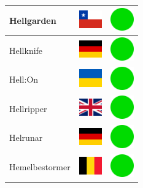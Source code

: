 \documentclass[12pt, a4paper, twoside]{report}
\begin{document}
\begin{center}
\begin{longtable}{|p{5cm}|p{2cm}|p{2cm}|}
 Hellgarden                                                 & \includegraphics[width=1cm]{4x3/cl} &   \includegraphics[width=1cm]{likes/y} \\ \hline
 Hellknife                                                  & \includegraphics[width=1cm]{4x3/de} &   \includegraphics[width=1cm]{likes/y} \\ \hline
 Hell:On                                                    & \includegraphics[width=1cm]{4x3/ua} &   \includegraphics[width=1cm]{likes/y} \\ \hline
 Hellripper                                                 & \includegraphics[width=1cm]{4x3/gb} &   \includegraphics[width=1cm]{likes/y} \\ \hline
 Helrunar                                                   & \includegraphics[width=1cm]{4x3/de} &   \includegraphics[width=1cm]{likes/y} \\ \hline
 Hemelbestormer                                             & \includegraphics[width=1cm]{4x3/be} &   \includegraphics[width=1cm]{likes/y} \\ \hline

\end{longtable}
\end{center}
\end{document}
